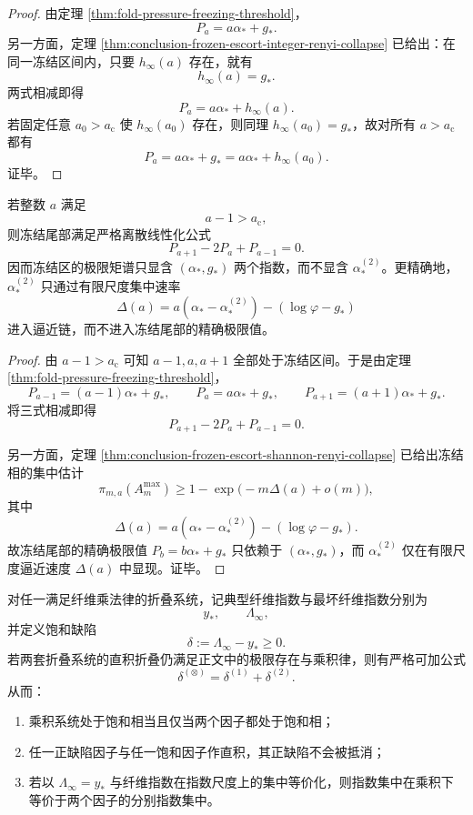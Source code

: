 \begin{proof}
由定理 \ref{thm:fold-pressure-freezing-threshold}，
\[
P_a=a\alpha_\ast+g_\ast.
\]
另一方面，定理 \ref{thm:conclusion-frozen-escort-integer-renyi-collapse} 已给出：在同一冻结区间内，只要 \(h_\infty(a)\) 存在，就有
\[
h_\infty(a)=g_\ast.
\]
两式相减即得
\[
P_a=a\alpha_\ast+h_\infty(a).
\]
若固定任意 \(a_0>a_{\mathrm c}\) 使 \(h_\infty(a_0)\) 存在，则同理 \(h_\infty(a_0)=g_\ast\)，故对所有 \(a>a_{\mathrm c}\) 都有
\[
P_a=a\alpha_\ast+g_\ast=a\alpha_\ast+h_\infty(a_0).
\]
证毕。
\end{proof}

\begin{theorem}[冻结尾部的零曲率与次大纤维指数的逼近可见性]\label{thm:conclusion-frozen-tail-zero-curvature-second-maximum-visibility}
若整数 \(a\) 满足
\[
a-1>a_{\mathrm c},
\]
则冻结尾部满足严格离散线性化公式
\[
P_{a+1}-2P_a+P_{a-1}=0.
\]
因而冻结区的极限矩谱只显含 \((\alpha_\ast,g_\ast)\) 两个指数，而不显含 \(\alpha_\ast^{(2)}\)。更精确地，\(\alpha_\ast^{(2)}\) 只通过有限尺度集中速率
\[
\Delta(a)=a(\alpha_\ast-\alpha_\ast^{(2)})-(\log\varphi-g_\ast)
\]
进入逼近链，而不进入冻结尾部的精确极限值。
\end{theorem}

\begin{proof}
由 \(a-1>a_{\mathrm c}\) 可知 \(a-1,a,a+1\) 全部处于冻结区间。于是由定理 \ref{thm:fold-pressure-freezing-threshold}，
\[
P_{a-1}=(a-1)\alpha_\ast+g_\ast,
\qquad
P_a=a\alpha_\ast+g_\ast,
\qquad
P_{a+1}=(a+1)\alpha_\ast+g_\ast.
\]
将三式相减即得
\[
P_{a+1}-2P_a+P_{a-1}=0.
\]

另一方面，定理 \ref{thm:conclusion-frozen-escort-shannon-renyi-collapse} 已给出冻结相的集中估计
\[
\pi_{m,a}(A_m^{\max})
\ge
1-\exp\!\bigl(-m\Delta(a)+o(m)\bigr),
\]
其中
\[
\Delta(a)=a(\alpha_\ast-\alpha_\ast^{(2)})-(\log\varphi-g_\ast).
\]
故冻结尾部的精确极限值 \(P_b=b\alpha_\ast+g_\ast\) 只依赖于 \((\alpha_\ast,g_\ast)\)，而 \(\alpha_\ast^{(2)}\) 仅在有限尺度逼近速度 \(\Delta(a)\) 中显现。证毕。
\end{proof}

\begin{theorem}[乘积折叠的饱和缺陷可加律]\label{thm:conclusion-product-fold-saturation-defect-additivity}
对任一满足纤维乘法律的折叠系统，记典型纤维指数与最坏纤维指数分别为
\[
y_\ast,
\qquad
\Lambda_\infty,
\]
并定义饱和缺陷
\[
\delta:=\Lambda_\infty-y_\ast\ge 0.
\]
若两套折叠系统的直积折叠仍满足正文中的极限存在与乘积律，则有严格可加公式
\[
\delta^{(\otimes)}=\delta^{(1)}+\delta^{(2)}.
\]
从而：
\begin{enumerate}
  \item 乘积系统处于饱和相当且仅当两个因子都处于饱和相；
  \item 任一正缺陷因子与任一饱和因子作直积，其正缺陷不会被抵消；
  \item 若以 \(\Lambda_\infty=y_\ast\) 与纤维指数在指数尺度上的集中等价化，则指数集中在乘积下等价于两个因子的分别指数集中。
\end{enumerate}
\end{theorem}

